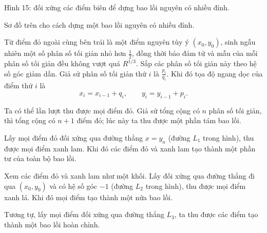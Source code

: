 \documentclass[11pt]{article}
\begin{document}
\begin{center}

\small Hình 15: đối xứng các điểm biên để dựng bao lồi nguyên có nhiều đỉnh.
\end{center}

Sơ đồ trên cho cách dựng một bao lồi nguyên có nhiều đỉnh.

Từ điểm đỏ ngoài cùng bên trái là một điểm nguyên tùy ý \((x_0,y_0)\), sinh
ngẫu nhiên một số phân số tối giản nhỏ hơn \(\frac12\), đồng thời bảo đảm tử
và mẫu của mỗi phân số tối giản đều không vượt quá \(R^{1/3}\). Sắp các phân
số tối giản này theo hệ số góc giảm dần. Giả sử phân số tối giản thứ \(i\) là
\(\frac{p_i}{q_i}\). Khi đó tọa độ ngang dọc của điểm thứ \(i\) là
\[
  x_i=x_{i-1}+q_i,\qquad y_i=y_{i-1}+p_i.
\]

Ta có thể lần lượt thu được mọi điểm đỏ. Giả sử tổng cộng có \(n\) phân số tối
giản, thì tổng cộng có \(n+1\) điểm đỏ; lúc này ta thu được một phần tám bao
lồi.

Lấy mọi điểm đỏ đối xứng qua đường thẳng \(x=y_n\) (đường \(L_1\) trong hình),
thu được mọi điểm xanh lam. Khi đó các điểm đỏ và xanh lam tạo thành một phần
tư của toàn bộ bao lồi.

Xem các điểm đỏ và xanh lam như một khối. Lấy đối xứng qua đường thẳng đi qua
\((x_0,y_0)\) và có hệ số góc \(-1\) (đường \(L_2\) trong hình), thu được mọi
điểm xanh lá. Khi đó mọi điểm tạo thành một nửa bao lồi.

Tương tự, lấy mọi điểm đối xứng qua đường thẳng \(L_3\), ta thu được các điểm
tạo thành một bao lồi hoàn chỉnh.
\end{document}
